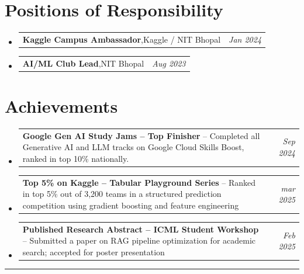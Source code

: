 \documentclass[a4paper,11pt]{article}
\makeatletter
\newcommand{\resumePOR}[3]{
\vspace{0.5mm}\item
    \begin{tabular*}{0.97\textwidth}[t]{l@{\extracolsep{\fill}}r}
        \textbf{#1},\hspace{0.3mm}#2 & \textit{\small #3}
    \end{tabular*}
    \vspace{-2mm}
}
\newcommand{\resumeAchievement}[3]{
\vspace{0.5mm}\item
    \begin{tabular*}{0.97\textwidth}[t]{p{0.78\textwidth}@{\extracolsep{\fill}}r}
        \textbf{#1} -- {\small #2} & \textit{\small #3}
    \end{tabular*}
    \vspace{-2mm}
}
\newcommand{\resumeSubHeadingListStart}{\begin{itemize}[leftmargin=*,labelsep=1.5mm]}
\newcommand{\resumeSubHeadingListEnd}{\end{itemize}\vspace{2mm}}
\makeatother
\begin{document}
\section{Positions of Responsibility}
\vspace{-0.4mm}
\resumeSubHeadingListStart
  \resumePOR{Kaggle Campus Ambassador}
    {Kaggle / NIT Bhopal}
    {Jan 2024}
  \resumePOR{AI/ML Club Lead}
    {NIT Bhopal}
    {Aug 2023}
\resumeSubHeadingListEnd
\vspace{-4mm}

\section{Achievements}
\vspace{-0.2mm}
\resumeSubHeadingListStart
  \resumeAchievement{Google Gen AI Study Jams -- Top Finisher}
    {Completed all Generative AI and LLM tracks on Google Cloud Skills Boost, ranked in top 10\% nationally.}
    {Sep 2024}
  \resumeAchievement{Top 5\% on Kaggle -- Tabular Playground Series}
    {Ranked in top 5\% out of 3,200 teams in a structured prediction competition using gradient boosting and feature engineering}
    {mar 2025}
  \resumeAchievement{Published Research Abstract -- ICML Student Workshop}
    {Submitted a paper on RAG pipeline optimization for academic search; accepted for poster presentation}
    {Feb 2025}
\resumeSubHeadingListEnd
\vspace{-2mm}

\hspace*{-5mm}\rule{1.035\textwidth}{0.1mm}
\end{document}
